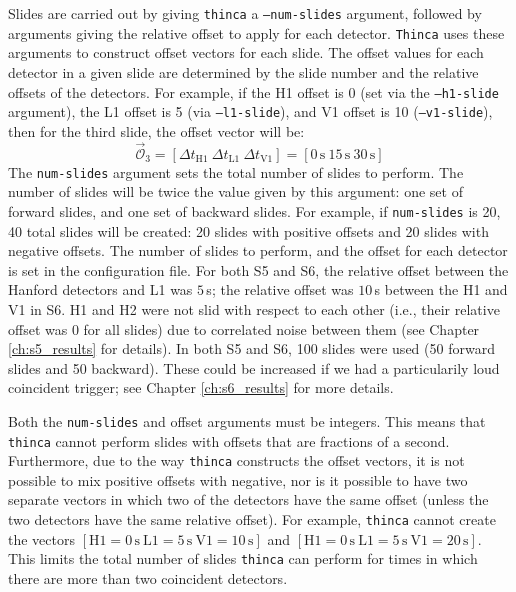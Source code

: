 Slides are carried out by giving \texttt{thinca} a \texttt{--num-slides}
argument, followed by arguments giving the relative offset to apply for each
detector. \texttt{Thinca} uses these arguments to construct offset vectors for
each slide. The offset values for each detector in a given slide are determined
by the slide number and the relative offsets of the detectors. For example, if
the H1 offset is 0 (set via the \texttt{--h1-slide} argument), the L1 offset is
5 (via \texttt{--l1-slide}), and V1 offset is 10 (\texttt{--v1-slide}), then
for the third slide, the offset vector will be:
\begin{equation}
\label{eqn:example_offsetvec}
\vec{\mathcal{O}}_3 = [\Delta t_{\mathrm{H1}} ~ \Delta t_{\mathrm{L1}} ~ \Delta t_{\mathrm{V1}}] = [0\,\mathrm{s} ~ 15\,\mathrm{s} ~ 30\,\mathrm{s}] 
\end{equation}
The \texttt{num-slides} argument sets the total number of slides to perform.
The number of slides will be twice the value given by this argument: one set of
forward slides, and one set of backward slides. For example, if
\texttt{num-slides} is 20, 40 total slides will be created: 20 slides with
positive offsets and 20 slides with negative offsets. The number of slides to
perform, and the offset for each detector is set in the configuration file. For
both \ac{S5} and \ac{S6}, the relative offset between the Hanford detectors and
L1 was $5\,$s; the relative offset was $10\,$s between the H1 and V1 in
\ac{S6}. H1 and H2 were not slid with respect to each other (i.e., their
relative offset was 0 for all slides) due to correlated noise between them (see
Chapter \ref{ch:s5_results} for details). In both \ac{S5} and \ac{S6}, 100
slides were used (50 forward slides and 50 backward). These could be increased
if we had a particularily loud coincident trigger; see Chapter
\ref{ch:s6_results} for more details. 

Both the \texttt{num-slides} and offset arguments must be integers. This means
that \texttt{thinca} cannot perform slides with offsets that are fractions of a
second. Furthermore, due to the way \texttt{thinca} constructs the offset
vectors, it is not possible to mix positive offsets with negative, nor is it
possible to have two separate vectors in which two of the detectors have the
same offset (unless the two detectors have the same relative offset). For
example, \texttt{thinca} cannot create the vectors $[\mathrm{H1} =
0\,\mathrm{s} ~ \mathrm{L1} = 5\,\mathrm{s} ~ \mathrm{V1} = 10\,\mathrm{s}]$
and $[\mathrm{H1} = 0\,\mathrm{s} ~ \mathrm{L1} = 5\,\mathrm{s} ~ \mathrm{V1} =
20\,\mathrm{s}]$. This limits the total number of slides \texttt{thinca} can
perform for times in which there are more than two coincident detectors.

